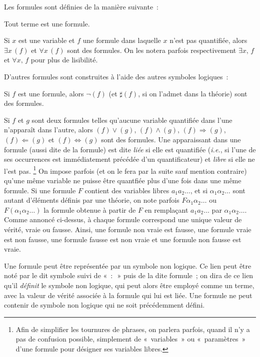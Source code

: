 \stopsubsection


\startsubsection[title=Formules]

Les formules sont définies de la manière suivante : 
\startitemize
  \item Tout terme est une formule. 
  \item Si $x$ est une variable et $f$ une formule dans laquelle $x$ n'est pas quantifiée, alors $\exists x \, (f)$ et $\forall x \, (f)$ sont des formules. 
      On les notera parfois respectivement $\exists x, \, f$ et $\forall x, \, f$ pour plus de lisibilité.
  \item D'autres formules sont construites à l'aide des autres symboles logiques : 
  \startitemize
    \item Si $f$ est une formule, alors $\lnot (f)$ (et $\sharp (f)$, si on l'admet dans la théorie) sont des formules.
    \item Si $f$ et $g$ sont deux formules telles qu'aucune variable quantifiée dans l'une n'apparaît dans l'autre, alors $(f) \vee (g)$, $(f) \wedge (g)$, $(f) \Rightarrow (g)$, $(f) \Leftarrow (g)$ et $(f) \Leftrightarrow (g)$ sont des formules.
  \stopitemize
\stopitemize
Une  apparaissant dans une formule (aussi dite \emph{} de la formule) est dite \emph{liée} si elle est quantifiée (\emph{i.e.}, si l'une de ses occurrences est immédiatement précédée d'un quantificateur) et \emph{libre} si elle ne l'est pas.%
\footnote{
    Afin de simplifier les tournures de phrases, on parlera parfois, quand il n'y a pas de confusion possible, simplement de « variables » ou « paramètres » d'une formule pour désigner ses variables libres. 
}
On impose parfois (et on le fera par la suite sauf mention contraire) qu'une même variable ne puisse être quantfiée plus d'une fois dans une même formule.
Si une formule $F$ contient des variables libres $a_1 a_2 \dots$, et si $\alpha_1 \alpha_2 \dots$ sont autant d'éléments définis par une théorie, on note parfois $F \alpha_1 \alpha_2 \dots$ ou $F (\alpha_1 \alpha_2 \dots)$ la formule obtenue à partir de $F$ en remplaçant $a_1 a_2 \dots$ par $\alpha_1 \alpha_2 \dots$.
Comme annoncé ci-dessus, à chaque formule correspond une unique valeur de vérité, vraie ou fausse. 
Ainsi, une formule non vraie est fausse, une formule vraie est non fausse, une formule fausse est non vraie et une formule non fausse est vraie.

Une formule peut être représentée par un symbole non logique. 
Ce lien peut être noté par le dit symbole suivi de « $:$ » puis de la dite formule ; on dira de ce lien qu'il \emph{définit} le symbole non logique, qui peut alors être employé comme un terme, avec la valeur de vérité associée à la formule qui lui est liée. 
Une formule ne peut contenir de symbole non logique qui ne soit précédemment défini. 

